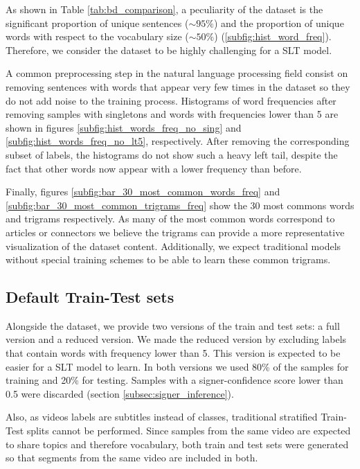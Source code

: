 

As shown in Table \ref{tab:bd_comparison}, a peculiarity of the dataset is the significant proportion of unique sentences (\(\sim95\%\)) and the proportion of unique words with respect to the vocabulary size (\(\sim50\%\)) (\ref{subfig:hist_word_freq}). Therefore, we consider the dataset to be highly challenging for a SLT model. 

A common preprocessing step in the natural language processing field consist on removing sentences with words that appear very few times in the dataset so they do not add noise to the training process. Histograms of word frequencies after removing samples with singletons and words with frequencies lower than 5 are shown in figures \ref{subfig:hist_words_freq_no_sing} and  \ref{subfig:hist_words_freq_no_lt5}, respectively. After removing the corresponding subset of labels, the histograms do not show such a heavy left tail, despite the fact that other words now appear with a lower frequency than before.



Finally, figures \ref{subfig:bar_30_most_common_words_freq} and \ref{subfig:bar_30_most_common_trigrams_freq} show the 30 most commons words and trigrams respectively. As many of the most common words correspond to articles or connectors we believe the trigrams can provide a more representative visualization of the dataset content. Additionally, we expect traditional models without special training schemes to be able to learn these common trigrams.



\subsection{Default Train-Test sets}\label{subsec:train_test_split}

Alongside the dataset, we provide two versions of the train and test sets: a full version and a reduced version. We made the reduced version by excluding labels that contain words with frequency lower than 5. This version is expected to be easier for a SLT model to learn. In both versions we used 80\% of the samples for training and 20\% for testing. Samples with a signer-confidence score lower than 0.5 were discarded (section \ref{subsec:signer_inference}).

Also, as videos labels are subtitles instead of classes, traditional stratified Train-Test splits cannot be performed. Since samples from the same video are expected to share topics and therefore vocabulary, both train and test sets were generated so that segments from the same video are included in both.

